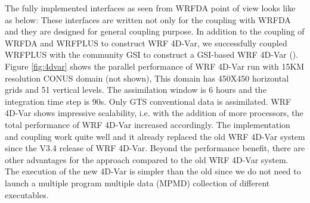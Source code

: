 \documentclass[12pt]{article}
\begin{document}
The fully implemented interfaces as seen from WRFDA point of view looks like as below:
These interfaces are written not only for the coupling with WRFDA and they are designed for general coupling purpose. In addition to the coupling of WRFDA and WRFPLUS to construct WRF 4D-Var, we successfully coupled WRFPLUS with the community GSI to construct a GSI-based WRF 4D-Var (\cite{Zhang2012}). Figure \ref{fig:4dvar} shows the parallel performance of WRF 4D-Var run with 15KM resolution CONUS domain (not shown), This domain has 450X450 horizontal grids and 51 vertical levels. The assimilation window is 6 hours and the integration time step is 90s. Only GTS conventional data is assimilated. WRF 4D-Var shows impressive scalability, i.e. with the addition of more processors, the total performance of WRF 4D-Var increased accordingly. The implementation and coupling work quite well and it already replaced the old WRF 4D-Var system since the V3.4 release of WRF 4D-Var. Beyond the performance benefit, there are other advantages for the approach compared to the old WRF 4D-Var system. The execution of the new 4D-Var is simpler than the old since we do not need to launch a multiple program multiple data (MPMD) collection of different executables.  
\end{document}
